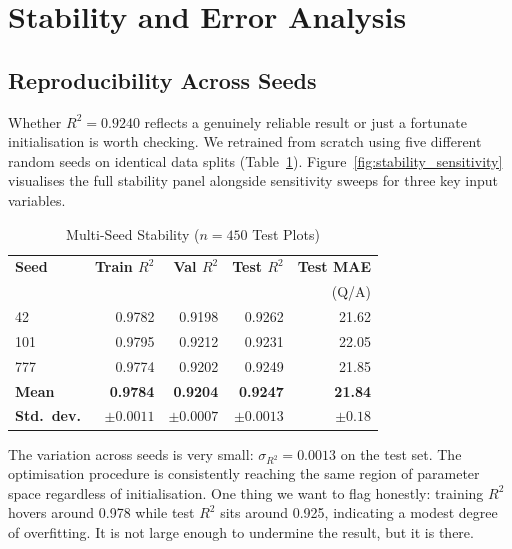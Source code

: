 \documentclass[conference,10pt,letterpaper]{IEEEtran}
\begin{document}
\section{Stability and Error Analysis}

\subsection{Reproducibility Across Seeds}
Whether $R^2 = 0.9240$ reflects a genuinely reliable result or just a fortunate initialisation is worth checking. We retrained from scratch using five different random seeds on identical data splits (Table~\ref{tab:multiseed}). Figure~\ref{fig:stability_sensitivity} visualises the full stability panel alongside sensitivity sweeps for three key input variables.

\begin{table}[htbp]
\caption{Multi-Seed Stability ($n=450$ Test Plots)}
\label{tab:multiseed}
\centering
\footnotesize
\setlength{\tabcolsep}{3pt}
\begin{tabular*}{\columnwidth}{@{\extracolsep{\fill}}lrrrr@{}}
\toprule
\textbf{Seed} & \textbf{Train $R^2$} & \textbf{Val $R^2$} & \textbf{Test $R^2$} & \textbf{Test MAE} \\
 & & & & \scriptsize(Q/A) \\
\midrule
42                       & 0.9782 & 0.9198 & 0.9262 & 21.62 \\
101                      & 0.9795 & 0.9212 & 0.9231 & 22.05 \\
777                      & 0.9774 & 0.9202 & 0.9249 & 21.85 \\
\midrule
\textbf{Mean}            & \textbf{0.9784} & \textbf{0.9204} & \textbf{0.9247} & \textbf{21.84} \\
\textbf{Std.\ dev.}      & $\pm 0.0011$ & $\pm 0.0007$ & $\pm 0.0013$ & $\pm 0.18$ \\
\bottomrule
\end{tabular*}
\end{table}

The variation across seeds is very small: $\sigma_{R^2} = 0.0013$ on the test set. The optimisation procedure is consistently reaching the same region of parameter space regardless of initialisation. One thing we want to flag honestly: training $R^2$ hovers around 0.978 while test $R^2$ sits around 0.925, indicating a modest degree of overfitting. It is not large enough to undermine the result, but it is there.
\end{document}
